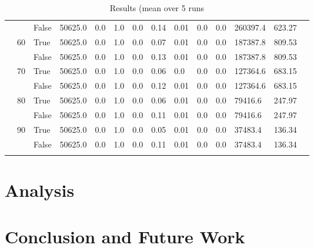 \documentclass{article}
\begin{document}
\begin{landscape}
\begin{small}
\begin{longtable}[c]{@{}lll|ll|ll|ll|ll|lll@{}}
   &    & False & 50625.0         & 0.0            & 1.0           & 0.0           & 0.14          & 0.01          & 0.0           & 0.0           & 260397.4      & 623.27      &  \\
   & 60 & True  & 50625.0         & 0.0            & 1.0           & 0.0           & 0.07          & 0.01          & 0.0           & 0.0           & 187387.8      & 809.53      &  \\
   &    & False & 50625.0         & 0.0            & 1.0           & 0.0           & 0.13          & 0.01          & 0.0           & 0.0           & 187387.8      & 809.53      &  \\
   & 70 & True  & 50625.0         & 0.0            & 1.0           & 0.0           & 0.06          & 0.0           & 0.0           & 0.0           & 127364.6      & 683.15      &  \\
   &    & False & 50625.0         & 0.0            & 1.0           & 0.0           & 0.12          & 0.01          & 0.0           & 0.0           & 127364.6      & 683.15      &  \\
   & 80 & True  & 50625.0         & 0.0            & 1.0           & 0.0           & 0.06          & 0.01          & 0.0           & 0.0           & 79416.6       & 247.97      &  \\
   &    & False & 50625.0         & 0.0            & 1.0           & 0.0           & 0.11          & 0.01          & 0.0           & 0.0           & 79416.6       & 247.97      &  \\
   & 90 & True  & 50625.0         & 0.0            & 1.0           & 0.0           & 0.05          & 0.01          & 0.0           & 0.0           & 37483.4       & 136.34      &  \\
   &    & False & 50625.0         & 0.0            & 1.0           & 0.0           & 0.11          & 0.01          & 0.0           & 0.0           & 37483.4       & 136.34      &  \\* \bottomrule
\caption{Results (mean over 5 runs}
\label{lab_res}\\
\end{longtable}
\end{small}
\end{landscape}

\section{Analysis}


\section{Conclusion and Future Work}


\printbibliography
\end{document}
